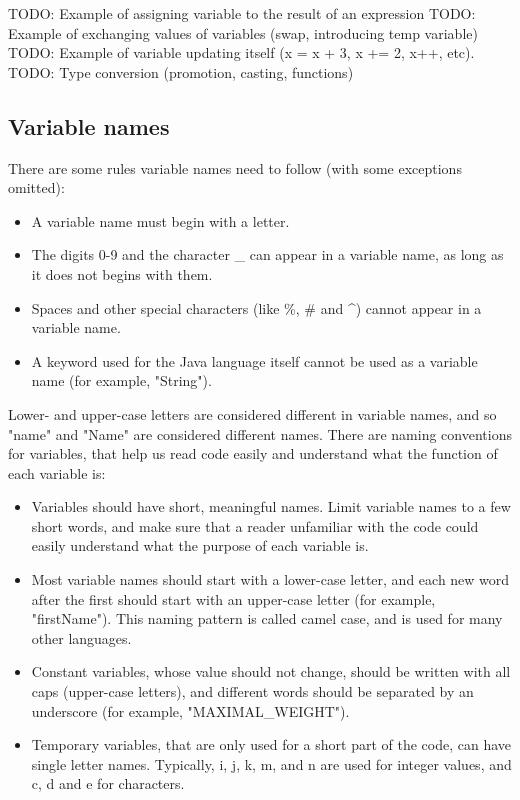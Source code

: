 TODO: Example of assigning variable to the result of an expression
TODO: Example of exchanging values of variables (swap, introducing temp variable)
TODO: Example of variable updating itself (x = x + 3, x += 2, x++, etc).
TODO: Type conversion (promotion, casting, functions)

\subsection{Variable names}

There are some rules variable names need to follow (with some exceptions omitted):

\begin{itemize}
\item A variable name must begin with a letter.
\item The digits 0-9 and the character _ can appear in a variable name, as long as it does not begins with them. 
\item Spaces and other special characters (like \%, # and ^) cannot appear in a variable name.
\item A keyword used for the Java language itself cannot be used as a variable name (for example, "String").
\end{itemize}

Lower- and upper-case letters are considered different in variable names, and so "name" and "Name" are considered different names. There are naming conventions for variables, that help us read code easily and understand what the function of each variable is:

\begin{itemize}
\item Variables should have short, meaningful names. Limit variable names to a few short words, and make sure that a reader unfamiliar with the code could easily understand what the purpose of each variable is. 
\item Most variable names should start with a lower-case letter, and each new word after the first should start with an upper-case letter (for example, "firstName"). This naming pattern is called camel case, and is used for many other languages.
\item Constant variables, whose value should not change, should be written with all caps (upper-case letters), and different words should be separated by an underscore (for example, "MAXIMAL_WEIGHT").
\item Temporary variables, that are only used for a short part of the code, can have single letter names. Typically, i, j, k, m, and n are used for integer values, and c, d and e for characters.
\end{itemize}

